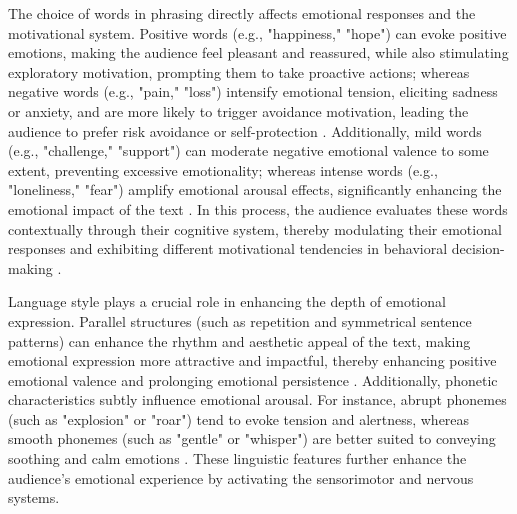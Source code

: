 The choice of words in phrasing directly affects emotional responses and the motivational system. Positive words (e.g., "happiness," "hope") can evoke positive emotions, making the audience feel pleasant and reassured, while also stimulating exploratory motivation, prompting them to take proactive actions; whereas negative words (e.g., "pain," "loss") intensify emotional tension, eliciting sadness or anxiety, and are more likely to trigger avoidance motivation, leading the audience to prefer risk avoidance or self-protection \cite{lee2020impact, calvo2010affect}. Additionally, mild words (e.g., "challenge," "support") can moderate negative emotional valence to some extent, preventing excessive emotionality; whereas intense words (e.g., "loneliness," "fear") amplify emotional arousal effects, significantly enhancing the emotional impact of the text \cite{nguyen2014affective}. In this process, the audience evaluates these words contextually through their cognitive system, thereby modulating their emotional responses and exhibiting different motivational tendencies in behavioral decision-making \cite{lazarus1991emotion}.

Language style plays a crucial role in enhancing the depth of emotional expression. Parallel structures (such as repetition and symmetrical sentence patterns) can enhance the rhythm and aesthetic appeal of the text, making emotional expression more attractive and impactful, thereby enhancing positive emotional valence and prolonging emotional persistence \cite{menninghaus2017emotional}. Additionally, phonetic characteristics subtly influence emotional arousal. For instance, abrupt phonemes (such as "explosion" or "roar") tend to evoke tension and alertness, whereas smooth phonemes (such as "gentle" or "whisper") are better suited to conveying soothing and calm emotions \cite{slavova2019towards}. These linguistic features further enhance the audience's emotional experience by activating the sensorimotor and nervous systems.

